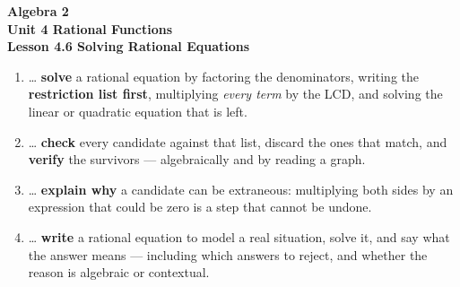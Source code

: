 \documentclass[10pt]{article}
\begin{document}
\vspace{-0.8in}

\begin{center}
  {\color{white}\textbf{\LARGE Algebra 2}}\\[4pt]
  {\color{forestmid}\large\textbf{Unit 4 \quad Rational Functions}}\\[6pt]
  {\color{white}\textbf{\large Lesson 4.6 \quad Solving Rational Equations}}
\end{center}

\vspace{0.22in}
\namedateperiod
\vspace{0.18in}

\begin{learningtargetbox}
\small
\begin{enumerate}[leftmargin=1.5em, itemsep=5pt]
  \item \ldots{} \textbf{solve} a rational equation by factoring the denominators, writing the
        \textbf{restriction list first}, multiplying \emph{every term} by the LCD, and solving the
        linear or quadratic equation that is left.
  \item \ldots{} \textbf{check} every candidate against that list, discard the ones that match, and
        \textbf{verify} the survivors --- algebraically and by reading a graph.
  \item \ldots{} \textbf{explain why} a candidate can be extraneous: multiplying both sides by an
        expression that could be zero is a step that cannot be undone.
  \item \ldots{} \textbf{write} a rational equation to model a real situation, solve it, and say what
        the answer means --- including which answers to reject, and whether the reason is algebraic or
        contextual.
\end{enumerate}
\end{learningtargetbox}

\vspace{0.14in}
\end{document}
